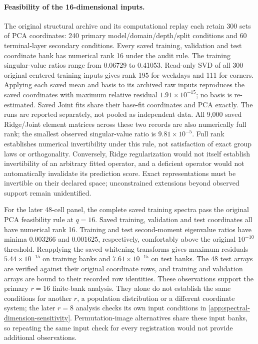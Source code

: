 \paragraph{Feasibility of the 16-dimensional inputs.}
The original structural archive and its computational replay each retain 300 sets of PCA coordinates: 240 primary model/domain/depth/split conditions and 60 terminal-layer secondary conditions. Every saved training, validation and test coordinate bank has numerical rank 16 under the audit rule. The training singular-value ratios range from 0.06729 to 0.41053. Read-only SVD of all 300 original centered training inputs gives rank 195 for weekdays and 111 for corners. Applying each saved mean and basis to its archived raw inputs reproduces the saved coordinates with maximum relative residual $1.91\times10^{-15}$; no basis is re-estimated. Saved Joint fits share their base-fit coordinates and PCA exactly. The runs are reported separately, not pooled as independent data. All 9,000 saved Ridge/Joint element matrices across these two records are also numerically full rank; the smallest observed singular-value ratio is $9.81\times10^{-5}$. Full rank establishes numerical invertibility under this rule, not satisfaction of exact group laws or orthogonality. Conversely, Ridge regularization would not itself establish invertibility of an arbitrary fitted operator, and a deficient operator would not automatically invalidate its prediction score. Exact representations must be invertible on their declared space; unconstrained extensions beyond observed support remain unidentified.

For the later 48-cell panel, the complete saved training spectra pass the original PCA feasibility rule at $q=16$. Saved training, validation and test coordinates all have numerical rank 16. Training and test second-moment eigenvalue ratios have minima $0.003266$ and $0.001625$, respectively, comfortably above the original $10^{-10}$ threshold. Reapplying the saved whitening transforms gives maximum residuals $5.44\times10^{-15}$ on training banks and $7.61\times10^{-15}$ on test banks. The 48 test arrays are verified against their original coordinate rows, and training and validation arrays are bound to their recorded row identities. These observations support the primary $r=16$ finite-bank analysis. They alone do not establish the same conditions for another $r$, a population distribution or a different coordinate system; the later $r=8$ analysis checks its own input conditions in \cref{app:spectral-dimension-sensitivity}. Permutation-image alternatives share these input banks, so repeating the same input check for every registration would not provide additional observations.


